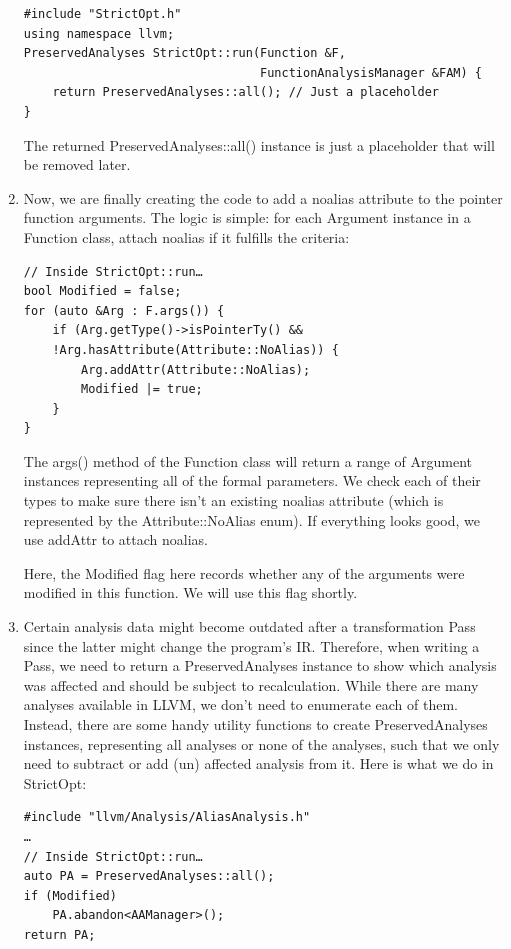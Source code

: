 \begin{enumerate}
\begin{lstlisting}[style=styleCXX]
#include "StrictOpt.h"
using namespace llvm;
PreservedAnalyses StrictOpt::run(Function &F,
                                 FunctionAnalysisManager &FAM) {
	return PreservedAnalyses::all(); // Just a placeholder
}
\end{lstlisting}

The returned PreservedAnalyses::all() instance is just a placeholder that will be removed later.

\item Now, we are finally creating the code to add a noalias attribute to the pointer function arguments. The logic is simple: for each Argument instance in a Function class, attach noalias if it fulfills the criteria:

\begin{lstlisting}[style=styleCXX]
// Inside StrictOpt::run…
bool Modified = false;
for (auto &Arg : F.args()) {
	if (Arg.getType()->isPointerTy() &&
	!Arg.hasAttribute(Attribute::NoAlias)) {
		Arg.addAttr(Attribute::NoAlias);
		Modified |= true;
	}
}
\end{lstlisting}

The args() method of the Function class will return a range of Argument instances representing all of the formal parameters. We check each of their types to make sure there isn't an existing noalias attribute (which is represented by the Attribute::NoAlias enum). If everything looks good, we use addAttr to attach noalias.

Here, the Modified flag here records whether any of the arguments were modified in this function. We will use this flag shortly.

\item Certain analysis data might become outdated after a transformation Pass since the latter might change the program's IR. Therefore, when writing a Pass, we need to return a PreservedAnalyses instance to show which analysis was affected and should be subject to recalculation. While there are many analyses available in LLVM, we don't need to enumerate each of them. Instead, there are some handy utility functions to create PreservedAnalyses instances, representing all analyses or none of the analyses, such that we only need to subtract or add (un) affected analysis from it. Here is what we do in StrictOpt:

\begin{lstlisting}[style=styleCXX]
#include "llvm/Analysis/AliasAnalysis.h"
…
// Inside StrictOpt::run…
auto PA = PreservedAnalyses::all();
if (Modified)
	PA.abandon<AAManager>();
return PA;
\end{lstlisting}


\end{enumerate}
